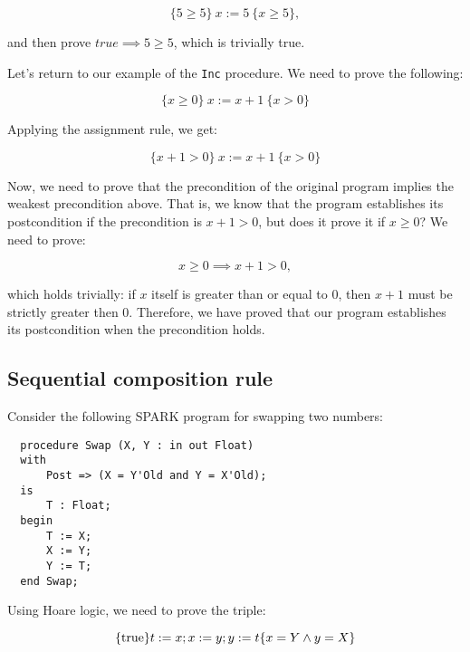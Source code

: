 \begin{displaymath}
\{5 \geq 5\} ~x := 5~ \{x \geq 5\},
\end{displaymath}

and then prove $true \implies 5 \geq 5$, which is trivially true.


\begin{example}
Let's return to our example of the \texttt{Inc} procedure. We need to prove the following:

\begin{displaymath}
  \{x \geq 0\}~ x := x + 1~ \{x > 0\}
\end{displaymath}

Applying the assignment rule, we get:

\begin{displaymath}
  \{x + 1 > 0\}~ x := x + 1~ \{x > 0\}
\end{displaymath}

Now, we need to prove that the precondition of the original program implies the weakest precondition above. That is, we know that the program establishes its postcondition if the precondition is $x + 1 > 0$, but does it prove it if $x \geq 0$? We need to prove:

\begin{displaymath}
  x \geq 0 \implies x + 1 > 0,
\end{displaymath}

which holds trivially: if $x$ itself is greater than or equal to 0, then $x + 1$ must be strictly greater then 0. Therefore, we have proved that our program establishes its postcondition when the precondition holds.

\end{example}


\subsection{Sequential composition rule}

Consider the following SPARK program for swapping two numbers:

\lstset{aboveskip=3mm}
\begin{lstlisting}
  procedure Swap (X, Y : in out Float)
  with
      Post => (X = Y'Old and Y = X'Old);
  is 
      T : Float;
  begin
      T := X;
      X := Y; 
      Y := T;
  end Swap;
\end{lstlisting}

Using Hoare logic, we need to prove the triple:

\begin{displaymath}
\{\textrm{true}\}\\
 t := x; \\
 x := y; \\
 y := t\\
\{x = Y \land y = X \}
\end{displaymath}


